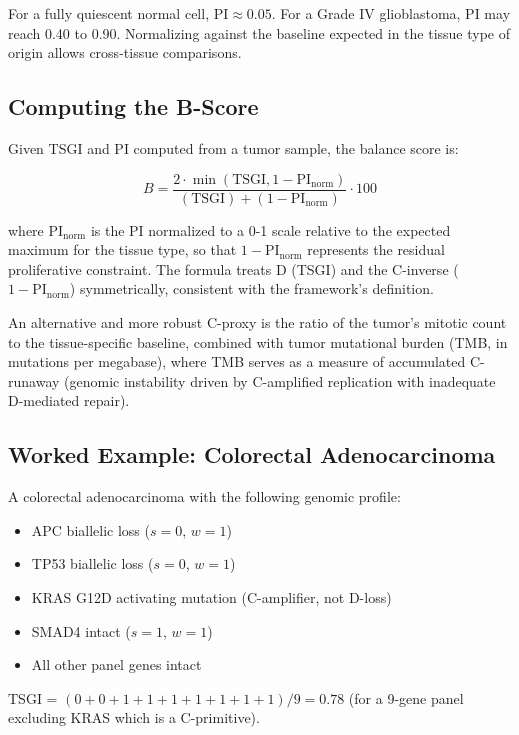 \documentclass[12pt]{article}
\providecommand{\tightlist}{%
  \setlength{\itemsep}{0pt}\setlength{\parskip}{0pt}}
\begin{document}
For a fully quiescent normal cell, \(\text{PI} \approx 0.05\). For a
Grade IV glioblastoma, \(\text{PI}\) may reach 0.40 to 0.90. Normalizing
against the baseline expected in the tissue type of origin allows
cross-tissue comparisons.

\subsection{Computing the B-Score}\label{computing-the-b-score}

Given TSGI and PI computed from a tumor sample, the balance score is:

\[B = \frac{2 \cdot \min(\text{TSGI}, 1 - \text{PI}_\text{norm})}{(\text{TSGI}) + (1 - \text{PI}_\text{norm})} \cdot 100\]

where \(\text{PI}_\text{norm}\) is the PI normalized to a 0-1 scale
relative to the expected maximum for the tissue type, so that
\(1 - \text{PI}_\text{norm}\) represents the residual proliferative
constraint. The formula treats D (TSGI) and the C-inverse
(\(1 - \text{PI}_\text{norm}\)) symmetrically, consistent with the
framework's definition.

An alternative and more robust C-proxy is the ratio of the tumor's
mitotic count to the tissue-specific baseline, combined with tumor
mutational burden (TMB, in mutations per megabase), where TMB serves as
a measure of accumulated C-runaway (genomic instability driven by
C-amplified replication with inadequate D-mediated repair).

\subsection{Worked Example: Colorectal Adenocarcinoma}\label{worked-example-colorectal-adenocarcinoma}

A colorectal adenocarcinoma with the following genomic profile:

\begin{itemize}
\tightlist
\item
  APC biallelic loss (\(s = 0\), \(w = 1\))
\item
  TP53 biallelic loss (\(s = 0\), \(w = 1\))
\item
  KRAS G12D activating mutation (C-amplifier, not D-loss)
\item
  SMAD4 intact (\(s = 1\), \(w = 1\))
\item
  All other panel genes intact
\end{itemize}

TSGI = \((0 + 0 + 1 + 1 + 1 + 1 + 1 + 1 + 1)/9 = 0.78\) (for a 9-gene
panel excluding KRAS which is a C-primitive).
\end{document}

